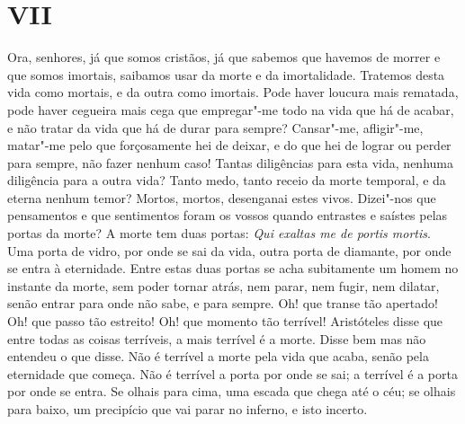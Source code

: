 \section*{VII}

Ora, senhores, já que somos cristãos, já que sabemos que havemos de
morrer e que somos imortais, saibamos usar da morte e da imortalidade.
Tratemos desta vida como mortais, e da outra como imortais. Pode haver
loucura mais rematada, pode haver cegueira mais cega que empregar"-me
todo na vida que há de acabar, e não tratar da vida que há de durar para
sempre? Cansar"-me, afligir"-me, matar"-me pelo que forçosamente hei de
deixar, e do que hei de lograr ou perder para sempre, não fazer nenhum
caso! Tantas diligências para esta vida, nenhuma diligência para a outra
vida? Tanto medo, tanto receio da morte temporal, e da eterna nenhum
temor? Mortos, mortos, desenganai estes vivos. Dizei"-nos que pensamentos
e que sentimentos foram os vossos quando entrastes e saístes pelas
portas da morte? A morte tem duas portas: \emph{Qui exaltas me de portis
mortis}. Uma porta de vidro, por onde se sai da vida, outra porta de
diamante, por onde se entra à eternidade. Entre estas duas portas se
acha subitamente um homem no instante da morte, sem poder tornar atrás,
nem parar, nem fugir, nem dilatar, senão entrar para onde não sabe, e
para sempre. Oh! que transe tão apertado! Oh! que passo tão estreito!
Oh! que momento tão terrível! Aristóteles disse que entre todas as
coisas terríveis, a mais terrível é
a morte. Disse bem mas não entendeu o que disse. Não é terrível a morte
pela vida que acaba, senão pela eternidade que começa. Não é terrível a
porta por onde se sai; a terrível é a porta por onde se entra. Se olhais
para cima, uma escada que chega até o céu; se olhais para baixo, um
precipício que vai parar no inferno, e isto incerto.

